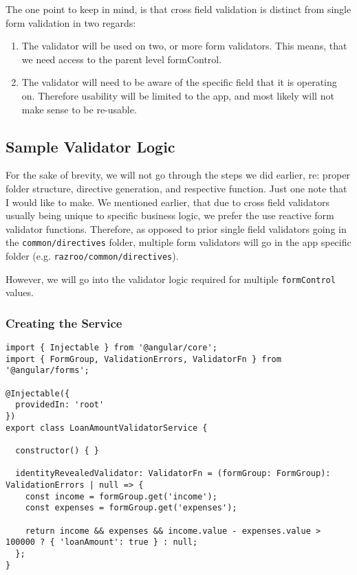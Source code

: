 The one point to keep in mind, is that cross field validation is distinct from single form validation in two regards: 
\begin{enumerate}
  \item The validator will be used on two, or more form validators. This 
  means, that we need access to the parent level formControl.
  \item The validator will need to be aware of the specific field that it is operating on. Therefore usability will be limited to the app, and most likely will not make sense to be re-usable. 
\end{enumerate}


\subsection{Sample Validator Logic}
For the sake of brevity, we will not go through the steps we did earlier, re: proper folder structure, directive generation, and respective function. Just one note that I would like to make. We mentioned earlier, that due to cross field validators usually being unique to specific business logic, we prefer the use reactive form validator functions. Therefore, as opposed to prior single field validators going in the \lstinline{common/directives} folder, multiple form validators will go in the app specific folder (e.g. \lstinline{razroo/common/directives}).

However, we will go into the validator logic required for multiple \lstinline{formControl} values. 

\subsubsection{Creating the Service}

\begin{lstlisting}[caption=loan-amount-validator.ts]
import { Injectable } from '@angular/core';
import { FormGroup, ValidationErrors, ValidatorFn } from '@angular/forms';

@Injectable({
  providedIn: 'root'
})
export class LoanAmountValidatorService {

  constructor() { }

  identityRevealedValidator: ValidatorFn = (formGroup: FormGroup): ValidationErrors | null => {
    const income = formGroup.get('income');
    const expenses = formGroup.get('expenses');

    return income && expenses && income.value - expenses.value > 100000 ? { 'loanAmount': true } : null;
  };
}  
\end{lstlisting}

